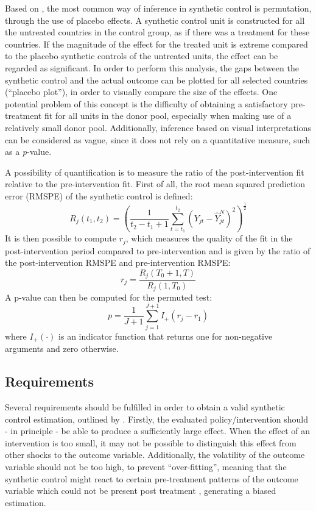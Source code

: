 \documentclass{scrbook}
\begin{document}
Based on \textcite{abadie_synthetic_2010}, the most common way of
inference in synthetic control is permutation, through the use of
placebo effects. A synthetic control unit is constructed for all the
untreated countries in the control group, as if there was a treatment
for these countries. If the magnitude of the effect for the treated unit
is extreme compared to the placebo synthetic controls of the untreated
units, the effect can be regarded as significant. In order to perform
this analysis, the gaps between the synthetic control and the actual
outcome can be plotted for all selected countries (``placebo plot''), in
order to visually compare the size of the effects. One potential problem
of this concept is the difficulty of obtaining a satisfactory
pre-treatment fit for all units in the donor pool, especially when
making use of a relatively small donor pool. Additionally, inference
based on visual interpretations can be considered as vague, since it
does not rely on a quantitative measure, such as a \textit{p}-value.

A possibility of quantification is to measure the ratio of the
post-intervention fit relative to the pre-intervention fit. First of
all, the root mean squared prediction error (RMSPE) of the synthetic
control is defined: \begin{equation}
R_{j}(t_{1},t_{2}) =(\frac{1}{t_{2}-t_{1}+1}\sum_{t=t_{1}}^{t_{2}}(Y_{jt}-\hat{Y}_{jt}^{N})^2)^\frac{1}{2}
\end{equation} It is then possible to compute \(r_{j}\), which measures
the quality of the fit in the post-intervention period compared to
pre-intervention and is given by the ratio of the post-intervention
RMSPE and pre-intervention RMSPE: \begin{equation}
r_{j}=\frac{R_{j}(T_{0}+1,T)}{R_{j}(1,T_{0})}
\end{equation} A p-value can then be computed for the permuted test:
\begin{equation}
p=\frac{1}{J+1}\sum_{j=1}^{J+1}I_{+}(r_{j}-r_{1})
\end{equation} where \(I_{+}(\cdot)\) is an indicator function that
returns one for non-negative arguments and zero otherwise.

\subsection*{Requirements}

Several requirements should be fulfilled in order to obtain a valid
synthetic control estimation, outlined by \textcite{abadie_using_2021}.
Firstly, the evaluated policy/intervention should - in principle - be
able to produce a sufficiently large effect. When the effect of an
intervention is too small, it may not be possible to distinguish this
effect from other shocks to the outcome variable. Additionally, the
volatility of the outcome variable should not be too high, to prevent
``over-fitting'', meaning that the synthetic control might react to
certain pre-treatment patterns of the outcome variable which could not
be present post treatment \parencite{hollingsworth_tactics_2022},
generating a biased estimation.
\end{document}
